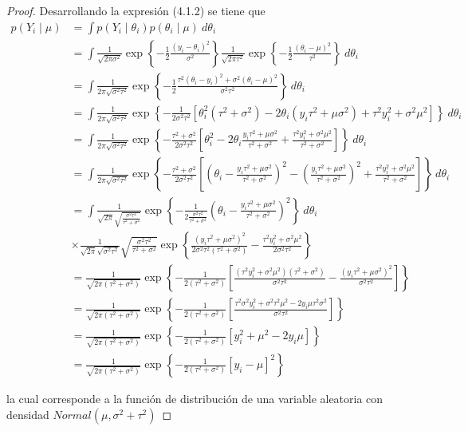 \begin{proof}
Desarrollando la expresión (4.1.2) se tiene que
\begin{align*}
p(Y_i \mid \mu)&=\int p(Y_i \mid \theta_i)p(\theta_i \mid \mu) \ d\theta_i\\
&=\int \frac{1}{\sqrt{2\pi\sigma^2}}\exp\left\{-\frac{1}{2}\frac{(y_i-\theta_i)^2}{\sigma^2}\right\} \frac{1}{\sqrt{2\pi\tau^2}}\exp\left\{-\frac{1}{2}\frac{(\theta_i-\mu)^2}{\tau^2}\right\}\ d\theta_i\\
&=\int \frac{1}{2\pi\sqrt{\sigma^2\tau^2}}
\exp\left\{-\frac{1}{2}\frac{\tau^2(\theta_i-y_i)^2+\sigma^2(\theta_i-\mu)^2}{\sigma^2\tau^2}\right\}\ d\theta_i\\
&=\int \frac{1}{2\pi\sqrt{\sigma^2\tau^2}}
\exp\left\{-\frac{1}{2\sigma^2\tau^2}\left[\theta_i^2(\tau^2+\sigma^2)
-2\theta_i(y_i\tau^2+\mu\sigma^2)+\tau^2y_i^2+\sigma^2\mu^2\right]\right\}\ d\theta_i\\
&=\int \frac{1}{2\pi\sqrt{\sigma^2\tau^2}}
\exp\left\{-\frac{\tau^2+\sigma^2}{2\sigma^2\tau^2}
\left[\theta_i^2-2\theta_i\frac{y_i\tau^2+\mu\sigma^2}{\tau^2+\sigma^2}
+\frac{\tau^2y_i^2+\sigma^2\mu^2}{\tau^2+\sigma^2}\right]\right\}\ d\theta_i\\
&=\int \frac{1}{2\pi\sqrt{\sigma^2\tau^2}}
\exp\left\{-\frac{\tau^2+\sigma^2}{2\sigma^2\tau^2}
\left[(\theta_i-\frac{y_i\tau^2+\mu\sigma^2}{\tau^2+\sigma^2})^2
-\left(\frac{y_i\tau^2+\mu\sigma^2}{\tau^2+\sigma^2}\right)^2
+\frac{\tau^2y_i^2+\sigma^2\mu^2}{\tau^2+\sigma^2}\right]\right\}\ d\theta_i\\
&=\int \frac{1}{\sqrt{2\pi}\sqrt{\frac{\sigma^2\tau^2}{\tau^2+\sigma^2}}}
\exp\left\{-\frac{1}{2\frac{\sigma^2\tau^2}{\tau^2+\sigma^2}}
\left(\theta_i-\frac{y_i\tau^2+\mu\sigma^2}{\tau^2+\sigma^2}\right)^2\right\}\ d\theta_i \\
& \times \frac{1}{\sqrt{2\pi}\sqrt{\sigma^2\tau^2}}\sqrt{\frac{\sigma^2\tau^2}{\tau^2+\sigma^2}}
\exp\left\{\frac{(y_i\tau^2+\mu\sigma^2)^2}{2\sigma^2\tau^2(\tau^2+\sigma^2)}
-\frac{\tau^2y_i^2+\sigma^2\mu^2}{2\sigma^2\tau^2}\right\}\\
&=\frac{1}{\sqrt{2\pi(\tau^2+\sigma^2)}}
\exp\left\{-\frac{1}{2(\tau^2+\sigma^2)}
\left[\frac{(\tau^2y_i^2+\sigma^2\mu^2)(\tau^2+\sigma^2)}{\sigma^2\tau^2}
-\frac{(y_i\tau^2+\mu\sigma^2)^2}{\sigma^2\tau^2}\right]\right\}\\
&=\frac{1}{\sqrt{2\pi(\tau^2+\sigma^2)}}
\exp\left\{-\frac{1}{2(\tau^2+\sigma^2)}
\left[\frac{\tau^2\sigma^2y_i^2+\sigma^2\tau^2\mu^2
-2y_i\mu\tau^2\sigma^2}{\sigma^2\tau^2}\right]\right\}\\
&=\frac{1}{\sqrt{2\pi(\tau^2+\sigma^2)}}
\exp\left\{-\frac{1}{2(\tau^2+\sigma^2)}\left[y_i^2+\mu^2-2y_i\mu\right]\right\}\\
&=\frac{1}{\sqrt{2\pi(\tau^2+\sigma^2)}}
\exp\left\{-\frac{1}{2(\tau^2+\sigma^2)}\left[y_i-\mu\right]^2\right\}
\end{align*}

la cual corresponde a la función de distribución de una variable aleatoria con densidad $Normal(\mu,\sigma^2+ \tau^2)$
\end{proof}


